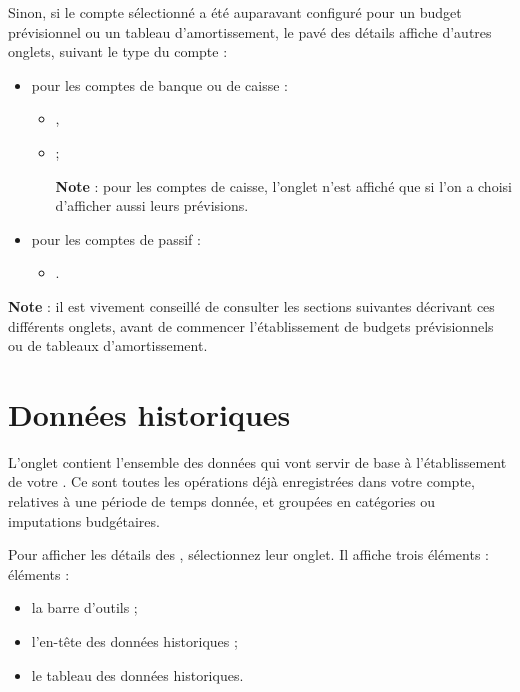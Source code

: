 Sinon, si le compte sélectionné a été auparavant configuré pour un budget prévisionnel ou un tableau d'amortissement, le pavé des détails affiche d'autres onglets, suivant le type du compte :

\begin{itemize}
	 \item pour les comptes de banque ou de caisse :
		\begin{itemize}
			 \item {},
			 \item {} ;

\textbf{Note} : pour les comptes de caisse, l'onglet  n'est affiché  que si l'on a choisi d'afficher aussi leurs prévisions.
		\end{itemize}
	 \item pour les comptes de passif :
		\begin{itemize}
			 \item {}.
		\end{itemize}
\end{itemize}

\textbf{Note} : il est vivement conseillé de consulter les sections suivantes décrivant ces différents onglets, avant de commencer l'établissement de budgets prévisionnels ou de tableaux d'amortissement.


\section{Données historiques\label{budget-data}}


L'onglet  contient l'ensemble des données qui vont servir de base à l'établissement de votre . Ce sont toutes les opérations déjà enregistrées dans votre compte, relatives à une période de temps donnée, et groupées en catégories ou imputations budgétaires.

Pour afficher les détails des , sélectionnez leur onglet. Il affiche trois \ifIllustration éléments :
\else éléments : 
\fi

\begin{itemize}
	\item la barre d'outils ;
	\item l'en-tête des données historiques ; 
	\item le tableau des données historiques.
\end{itemize}

